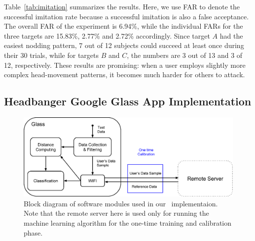 Table~\ref{tab:imitation} summarizes the results. Here, we use FAR to denote the successful imitation rate because a successful imitation is also a false acceptance. The overall FAR of the experiment is 6.94\%, while the individual FARs for the three targets are 15.83\%, 2.77\% and 2.72\% accordingly.  Since target $A$ had the easiest nodding pattern, 7 out of 12 subjects could succeed at least once during their 30 trials, while for targets $B$ and $C$, the numbers are  3 out of 13 and 3 of 12, respectively. These results are promising: when a user employs slightly more complex head-movement patterns, it becomes much harder for others to attack.


\subsection{Headbanger Google Glass App Implementation}\label{subsec:app}

\begin{figure}[t]
\centering
\includegraphics [width=.75\columnwidth]{figure/software_arch.eps}
\caption{Block diagram of software modules used in our \systemname~implementaion. Note that the remote server here is used only for running the machine learning algorithm for the one-time training and calibration phase.}
\label{fig:glass-softwarearch}
\vspace{-1mm}
\end{figure}

